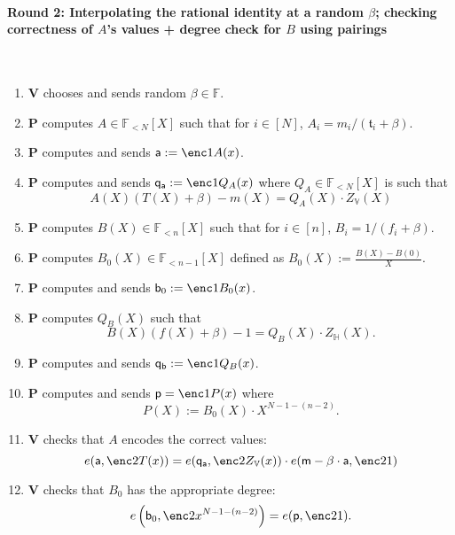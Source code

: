 \documentclass[11pt]{article} %
\newcommand{\F}{\ensuremath{\mathbb F}\xspace}
\newcommand{\defeq}{:=}
\newcommand{\prv}{\ensuremath{\mathsf{\mathbf{P}}}\xspace}
\newcommand{\ver}{\ensuremath{\mathsf{\mathbf{V}}}\xspace}
\newcommand{\polysofdeg}[1]{\ensuremath{\F_{< #1}[X]}\xspace}
\newcommand{\subspace}{\ensuremath{\mathbb{H}}\xspace}
\newcommand{\bigspace}{\ensuremath{\mathbb{V}}\xspace}
\newcommand{\witsize}{\ensuremath{n}\xspace}
\newcommand{\tabsize}{\ensuremath{N}\xspace}
\newcommand{\tab}{\ensuremath{\mathfrak{t}}\xspace}
\renewcommand{\a}{\ensuremath{\mathsf{a}}\xspace}
\renewcommand{\b}{\ensuremath{\mathsf{b}_0}\xspace}
\renewcommand{\p}{\ensuremath{\mathsf{p}}\xspace}
\newcommand{\qa}{\ensuremath{\mathsf{q_a}}\xspace}
\newcommand{\qb}{\ensuremath{\mathsf{q_b}}\xspace}
\newcommand{\m}{\ensuremath{\mathsf{m}}\xspace}
\newcommand{\degoffset}{\ensuremath{\tabsize-1-(\witsize-2)}\xspace}
\begin{document}
	\paragraph{\textbf{Round 2:} Interpolating the rational identity at a random $\beta$; checking correctness of  $A$'s values + degree check for $B$ using pairings} \ \\
 
\begin{enumerate}
 \item \ver chooses and sends random $\beta \in \F$.
\item \prv computes $A\in \polysofdeg{\tabsize}$ such that for $i\in [\tabsize]$, $A_i = m_i/(\tab_i+\beta)$.
\item \prv computes and sends $\a\defeq \enc1{A(x)}$.
\item\label{step:computeQA} \prv computes and sends $\qa \defeq \enc1{Q_A(x)}$ where $Q_A\in \polysofdeg{\tabsize}$ is such that 
\[A(X)(T(X)+\beta)-m(X)= Q_A(X)\cdot Z_\bigspace(X)\]
\item \prv computes $B(X)\in \polysofdeg{\witsize}$ such that for $i\in [\witsize]$, $B_i=1/(f_i+\beta)$.
\item\label{step:compB0}  \prv computes $B_0(X)\in \polysofdeg{\witsize-1}$ defined as $B_0(X)\defeq \frac{B(X)-B(0)}{X}$.
\item \prv computes and sends $\b\defeq \enc1{B_0(x)}$.
\item \prv computes $Q_B(X)$ such that 
\[B(X)(f(X)+\beta)-1 = Q_B(X)\cdot Z_\subspace(X).\]
\item \prv computes and sends $\qb\defeq \enc1{Q_B(x)}$.

\item \prv computes and sends $\p=\enc1{P(x)}$ where
\[P(X)\defeq  B_0(X)\cdot X^{\degoffset}. \]
\item\label{step:checkqa} \ver checks that $A$ encodes the correct values:
\[e(\a,\enc2{T(x)})=e(\qa,\enc2{Z_\bigspace(x)})\cdot e(\m-\beta\cdot \a,\enc2{1})\]
\item\label{step:checkadeg} \ver checks that $B_0$ has the appropriate degree:
\[e\left(\b,\enc2{x^{\degoffset}}\right)=e(\p,\enc2{1}).\]
 \end{enumerate}
\end{document}
